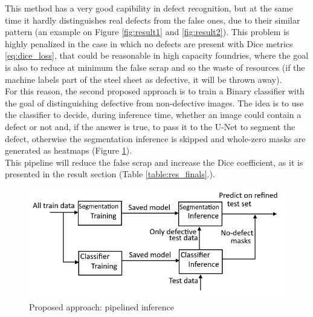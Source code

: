 \documentclass[10pt,twocolumn,letterpaper]{article}
\begin{document}
   This method has a very good capibility in defect recognition, but at the same time it hardly distinguishes real defects from the false ones, due to their similar pattern (an example on Figure \ref{fig:result1} and \ref{fig:result2}). This problem is highly penalized in the case in which no defects are present with Dice metrics \eqref{eq:dice_loss}, that could be reasonable in high capacity foundries, where the goal is also to reduce at minimum the false scrap and so the waste of resources (if the machine labels part of the steel sheet as defective, it will be thrown away).\\
   For this reason, the second proposed approach is to train a Binary classifier with the goal of distinguishing defective from non-defective images. The idea is to use the classifier to decide, during inference time, whether an image could contain a defect or not and, if the answer is true, to pass it to the U-Net to segment the defect, otherwise the segmentation inference is skipped and whole-zero masks are generated as heatmaps (Figure \ref{fig:secondApproach}).\\
   This pipeline will reduce the false scrap and increase the Dice coefficient, as it is presented in the result section (Table \ref{table:res_finals}.).
    
   \begin{figure}[h]
      \caption{Proposed approach: pipelined inference } \label{fig:secondApproach}
      \includegraphics[scale=0.48]{Img_SecondApproach}
   \end{figure}
\end{document}
